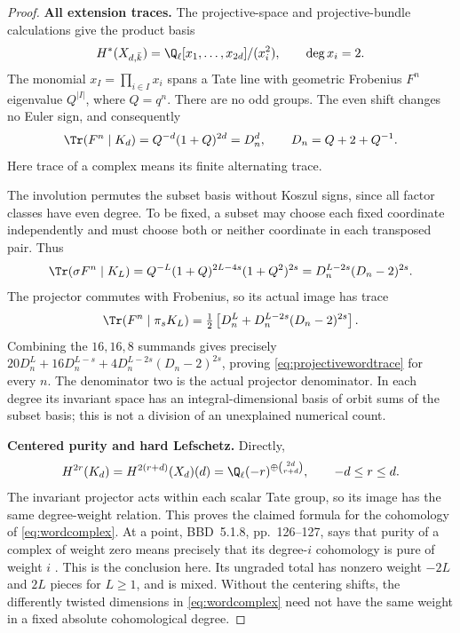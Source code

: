 \begin{proof}
\par\smallskip\noindent\textbf{All extension traces.}\quad
The projective-space and projective-bundle calculations
\cite[Example~16.3, p.~109; Theorem~23.2, pp.~139--140]{Milne}
give the product basis
\[
 H^*(X_{d,\bar k})=\Q_\ell[x_1,\ldots,x_{2d}]/(x_i^2),
 \qquad \deg x_i=2.
\]
The monomial $x_I=\prod_{i\in I}x_i$ spans a Tate line with
geometric Frobenius $F^n$ eigenvalue $Q^{|I|}$, where $Q=q^n$.
There are no odd groups. The even shift changes no Euler sign,
and consequently
\[
 \Tr(F^n\mid K_d)=Q^{-d}(1+Q)^{2d}=D_n^d,
 \qquad D_n=Q+2+Q^{-1}.
\]
Here trace of a complex means its finite alternating trace.

The involution permutes the subset basis without Koszul signs,
since all factor classes have even degree. To be fixed, a subset
may choose each fixed coordinate independently and must choose
both or neither coordinate in each transposed pair. Thus
\[
 \Tr(\sigma F^n\mid K_L)
   =Q^{-L}(1+Q)^{2L-4s}(1+Q^2)^{2s}
   =D_n^{L-2s}(D_n-2)^{2s}.
\]
The projector commutes with Frobenius, so its actual image has trace
\[
 \Tr(F^n\mid\pi_sK_L)
   =\tfrac12\left[D_n^L+D_n^{L-2s}(D_n-2)^{2s}\right].
\]
Combining the $16,16,8$ summands gives precisely
$20D_n^L+16D_n^{L-s}+4D_n^{L-2s}(D_n-2)^{2s}$,
proving \eqref{eq:projectivewordtrace} for every $n$.
The denominator two is the actual projector denominator.
In each degree its invariant space has an integral-dimensional
basis of orbit sums of the subset basis; this is not a division
of an unexplained numerical count.

\par\smallskip\noindent\textbf{Centered purity and hard Lefschetz.}\quad
Directly,
\[
 H^{2r}(K_d)=H^{2(r+d)}(X_d)(d)
   =\Q_\ell(-r)^{\oplus\binom{2d}{r+d}},\qquad -d\le r\le d.
\]
The invariant projector acts within each scalar Tate group, so
its image has the same degree-weight relation. This proves the
claimed formula for the cohomology of \eqref{eq:wordcomplex}.
At a point, BBD~5.1.8, pp.~126--127, says that purity of a
complex of weight zero means precisely that its degree-$i$
cohomology is pure of weight $i$ \cite{BBD}.
This is the conclusion here. Its ungraded total has nonzero
weight $-2L$ and $2L$ pieces for $L\ge1$, and is mixed.
Without the centering shifts, the differently twisted dimensions
in \eqref{eq:wordcomplex} need not have the same weight in a
fixed absolute cohomological degree.


\end{proof}
